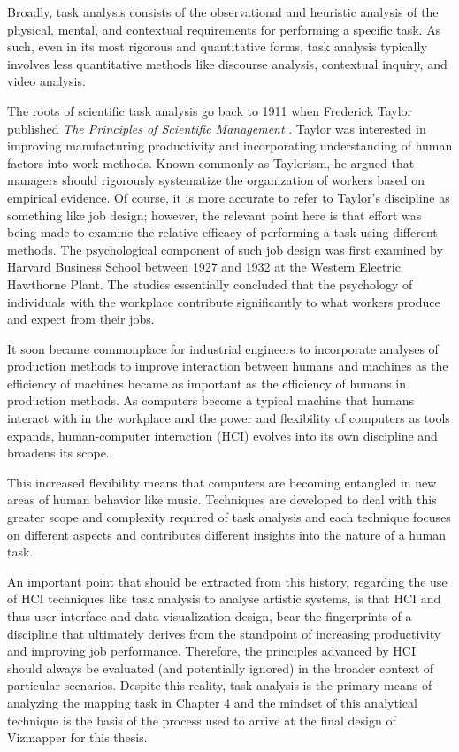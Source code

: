 Broadly, task analysis consists of the observational and heuristic analysis of the physical, mental, and contextual requirements for performing a specific task. As such, even in its most rigorous and quantitative forms, task analysis typically involves less quantitative methods like discourse analysis, contextual inquiry, and video analysis. 

The roots of scientific task analysis go back to 1911 when Frederick Taylor published \emph{The Principles of Scientific Management} \cite{crystal2004}. Taylor was interested in improving manufacturing productivity and incorporating understanding of human factors into work methods. Known commonly as Taylorism, he argued that managers should rigorously systematize the organization of workers based on empirical evidence. Of course, it is more accurate to refer to Taylor's discipline as something like job design; however, the relevant point here is that effort was being made to examine the relative efficacy of performing a task using different methods. The psychological component of such job design was first examined by Harvard Business School between 1927 and 1932 at the Western Electric Hawthorne Plant. The studies essentially concluded that the psychology of individuals with the workplace contribute significantly to what workers produce and expect from their jobs.

It soon became commonplace for industrial engineers to incorporate analyses of production methods to improve interaction between humans and machines as the efficiency of machines became as important as the efficiency of humans in production methods. As computers become a typical machine that humans interact with in the workplace and the power and flexibility of computers as tools expands, human-computer interaction (HCI) evolves into its own discipline and broadens its scope. 

This increased flexibility means that computers are becoming entangled in new areas of human behavior like music. Techniques are developed to deal with this greater scope and complexity required of task analysis and each technique focuses on different aspects and contributes different insights into the nature of a human task.

An important point that should be extracted from this history, regarding the use of HCI techniques like task analysis to analyse artistic systems, is that HCI and thus user interface and data visualization design, bear the fingerprints of a discipline that ultimately derives from the standpoint of increasing productivity and improving job performance. Therefore, the principles advanced by HCI should always be evaluated (and potentially ignored) in the broader context of particular scenarios. Despite this reality, task analysis is the primary means of analyzing the mapping task in Chapter 4 and the mindset of this analytical technique is the basis of the process used to arrive at the final design of Vizmapper for this thesis.


